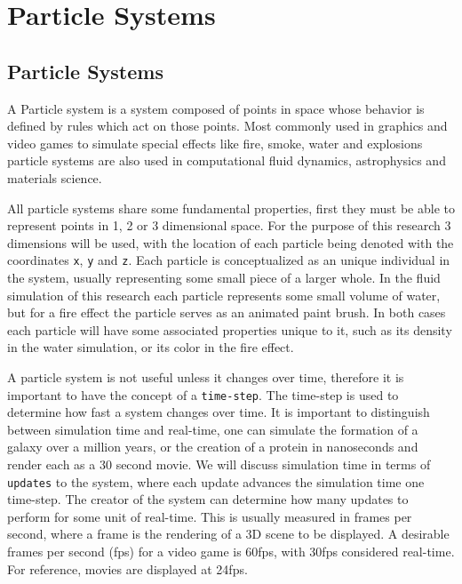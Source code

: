 \chapter{Particle Systems}

\section{Particle Systems}
A Particle system is a system composed of points in space whose behavior is
defined by rules which act on those points. Most commonly used in graphics and
video games to simulate special effects like fire, smoke, water and explosions
particle systems are also used in computational fluid dynamics, astrophysics
and materials science.

\begin{comment}
\begin{figure}[!htc]
		\texttt{[image: figures/pretty\_particles.png]}
		\label{fig:logic}
        \caption{ pretty particle system picture }
\end{figure}
\end{comment}



All particle systems share some fundamental properties, first they must be able
to represent points in 1, 2 or 3 dimensional space. For the purpose of this
research  3 dimensions will be used, with the location of each particle being
denoted with the coordinates \verb|x|, \verb|y| and \verb|z|. Each particle is
conceptualized as an unique individual in the system, usually representing some
small piece of a larger whole. In the fluid simulation of this research each
particle represents some small volume of water, but for a fire effect the
particle serves as an animated paint brush. In both cases each particle will
have some associated properties unique to it, such as its density in the water
simulation, or its color in the fire effect.


A particle system is not useful unless it changes over time, therefore it is
important to have the concept of a \verb|time-step|. The time-step is used to
determine how fast a system changes over time. It is important to distinguish
between simulation time and real-time, one can simulate the formation of a
galaxy over a million years, or the creation of a protein in nanoseconds and
render each as a 30 second movie. We will discuss simulation time in terms of
\verb|updates| to the system, where each update advances the simulation time
one time-step. The creator of the system can determine how many updates to
perform for some unit of real-time. This is usually measured in frames per
second, where a frame is the rendering of a 3D scene to be displayed. A
desirable frames per second (fps) for a video game is 60fps, with 30fps
considered real-time. For reference, movies are displayed at 24fps. 


